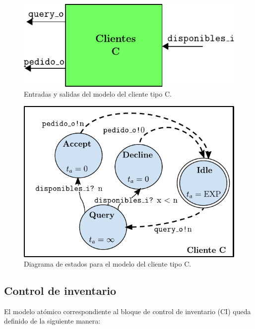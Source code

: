 \documentclass[10pt]{article}
\begin{document}
\begin{figure}[h]
	\centering
	\includegraphics{img/CTC-esquematico}
	\caption{Entradas y salidas del modelo del cliente tipo C.}
	\label{fig:CTC-esquematico}
\end{figure}

\begin{figure}[h]
	\centering
	\includegraphics{img/clienteCdevsgraph}
	\caption{Diagrama de estados para el modelo del cliente tipo C.}
	\label{fig:CTC-estados}
\end{figure}
\FloatBarrier


\subsection{Control de inventario\label{sec:CI}}
El modelo atómico correspondiente al bloque de control de inventario (CI) queda definido de la siguiente manera:
\end{document}
